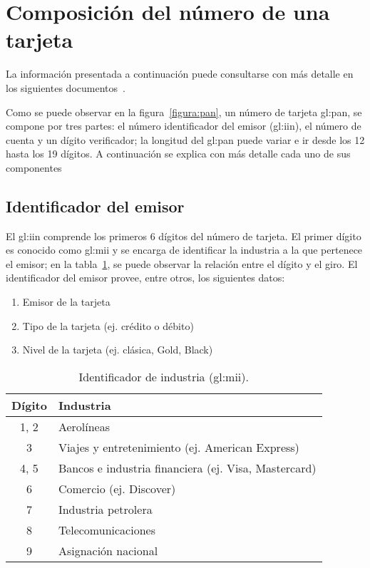 %
%

\section{Composición del número de una tarjeta}
\label{sec:composicion_tarjeta}

La información presentada a continuación puede consultarse con más detalle en
los siguientes documentos~\cite{iso_7812, iso_9362, pci_definitive_guide}.

Como se puede observar en la figura~\ref{figura:pan}, un número de tarjeta
\gls{gl:pan}, se compone por tres partes: el número identificador del emisor
(\gls{gl:iin}), el número de cuenta y un dígito verificador; la longitud del
\gls{gl:pan} puede variar e ir desde los 12 hasta los 19 dígitos. A
continuación se explica con más detalle cada uno de sus componentes

\subsection{Identificador del emisor}
El \gls{gl:iin} comprende los primeros 6 dígitos del número de
tarjeta. El primer dígito es conocido como \gls{gl:mii} y se encarga de
identificar la industria a la que pertenece el emisor; en la
tabla~\ref{tabla:mii}, se puede observar la relación entre el dígito y el giro.
El identificador del emisor provee, entre otros, los siguientes datos:

\begin{enumerate}
    \item Emisor de la tarjeta
    \item Tipo de la tarjeta (ej. crédito o débito)
    \item Nivel de la tarjeta (ej. clásica, Gold, Black)
\end{enumerate}

\begin{table}
  \centering
  \begin{tabular}{ c|l }
    Dígito & Industria \\ \hline
    1, 2 & Aerolíneas \\
    3 & Viajes y entretenimiento (ej. American Express) \\
    4, 5 &  Bancos e industria financiera (ej. Visa, Mastercard)\\
    6 & Comercio (ej. Discover) \\
    7 &  Industria petrolera \\
    8 &  Telecomunicaciones \\
    9 &  Asignación nacional \\
    \end{tabular}
    \caption{Identificador de industria (\gls{gl:mii}).}\label{tabla:mii}
\end{table}

